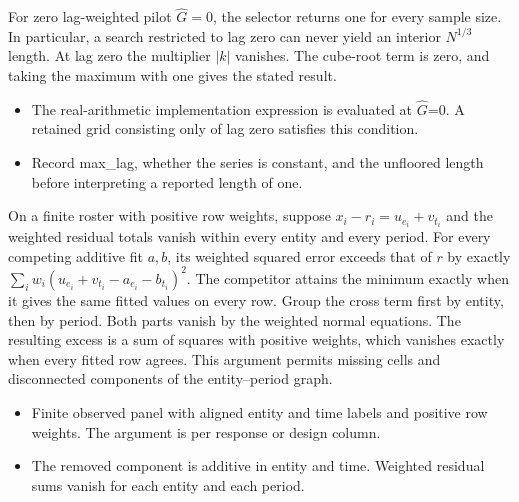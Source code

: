 \expandafter\def\csname statadic@statement@STATADIC-BLOCKLENGTH-005\endcsname{For zero lag-weighted pilot $\hat G=0$, the selector
  returns one for every sample size. In particular, a search restricted
  to lag zero can never yield an interior $N^{1/3}$ length.}
\expandafter\def\csname statadic@proof@STATADIC-BLOCKLENGTH-005\endcsname{At lag zero the multiplier $|k|$ vanishes. The cube-root
  term is zero, and taking the maximum with one gives the stated result.}
\expandafter\def\csname statadic@assumptions@STATADIC-BLOCKLENGTH-005\endcsname{\begin{itemize}
\item The real-arithmetic implementation expression is evaluated at \ensuremath{\hat G}=0. A retained grid consisting only of lag zero satisfies this condition.
\end{itemize}}
\expandafter\def\csname statadic@diagnostics@STATADIC-BLOCKLENGTH-005\endcsname{\begin{itemize}
\item Record max\_lag, whether the series is constant, and the unfloored length before interpreting a reported length of one.
\end{itemize}}
\expandafter\def\csname statadic@statement@STATADIC-PANEL-002\endcsname{On a finite roster with positive row weights, suppose
  $x_i-r_i=u_{e_i}+v_{t_i}$ and the weighted residual totals vanish within
  every entity and every period. For every competing additive fit $a,b$,
  its weighted squared error exceeds that of $r$ by exactly
  $\sum_i w_i(u_{e_i}+v_{t_i}-a_{e_i}-b_{t_i})^2$. The competitor attains
  the minimum exactly when it gives the same fitted values on every row.}
\expandafter\def\csname statadic@proof@STATADIC-PANEL-002\endcsname{Group the cross term first by entity, then by period. Both
  parts vanish by the weighted normal equations. The resulting excess is a
  sum of squares with positive weights, which vanishes exactly when every
  fitted row agrees. This argument permits missing cells and disconnected
  components of the entity--period graph.}
\expandafter\def\csname statadic@assumptions@STATADIC-PANEL-002\endcsname{\begin{itemize}
\item Finite observed panel with aligned entity and time labels and positive row weights. The argument is per response or design column.
\item The removed component is additive in entity and time. Weighted residual sums vanish for each entity and each period.
\end{itemize}}
